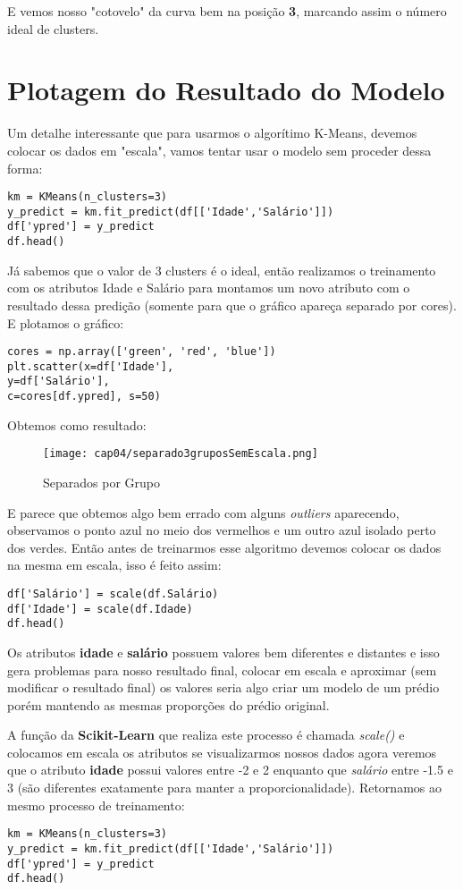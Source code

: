 E vemos nosso "cotovelo" da curva bem na posição \textbf{3}, marcando assim o número ideal de clusters.

\section{Plotagem do Resultado do Modelo}
Um detalhe interessante que para usarmos o algorítimo K-Means, devemos colocar os dados em "escala", vamos tentar usar o modelo sem proceder dessa forma:
\begin{lstlisting}[]
km = KMeans(n_clusters=3)
y_predict = km.fit_predict(df[['Idade','Salário']])
df['ypred'] = y_predict
df.head()
\end{lstlisting}

Já sabemos que o valor de 3 clusters é o ideal, então realizamos o treinamento com os atributos Idade e Salário para montamos um novo atributo com o resultado dessa predição (somente para que o gráfico apareça separado por cores). E plotamos o gráfico:
\begin{lstlisting}[]
cores = np.array(['green', 'red', 'blue'])
plt.scatter(x=df['Idade'],
y=df['Salário'],
c=cores[df.ypred], s=50)
\end{lstlisting}

Obtemos como resultado:
\begin{figure}[H]
	\centering
	\texttt{[image: cap04/separado3gruposSemEscala.png]}
	\caption{Separados por Grupo}
\end{figure}

E parece que obtemos algo bem errado com alguns \textit{outliers} aparecendo, observamos o ponto azul no meio dos vermelhos e um outro azul isolado perto dos verdes. Então antes de treinarmos esse algoritmo devemos colocar os dados na mesma em escala, isso é feito assim:
\begin{lstlisting}[]
df['Salário'] = scale(df.Salário)
df['Idade'] = scale(df.Idade)
df.head()
\end{lstlisting}

Os atributos \textbf{idade} e \textbf{salário} possuem valores bem diferentes e distantes e isso gera problemas para nosso resultado final, colocar em escala e aproximar (sem modificar o resultado final) os valores seria algo criar um modelo de um prédio porém mantendo as mesmas proporções do prédio original.

A função da \textbf{Scikit-Learn} que realiza este processo é chamada \textit{scale()} e colocamos em escala os atributos se visualizarmos nossos dados agora veremos que o atributo \textbf{idade} possui valores entre -2 e 2 enquanto que \textit{salário} entre -1.5 e 3 (são diferentes exatamente para manter a proporcionalidade). Retornamos ao mesmo processo de treinamento:
\begin{lstlisting}[]
km = KMeans(n_clusters=3)
y_predict = km.fit_predict(df[['Idade','Salário']])
df['ypred'] = y_predict
df.head()
\end{lstlisting}


